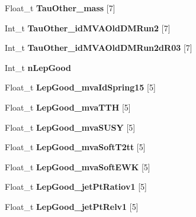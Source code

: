 \begin{DoxyCompactItemize}
Float\+\_\+t {\bfseries Tau\+Other\+\_\+mass} \mbox{[}7\mbox{]}
\item 
\hypertarget{classMiniTree_ae2bc89d76cd0c3ee34619f2c61dff15e}{}\label{classMiniTree_ae2bc89d76cd0c3ee34619f2c61dff15e} 
Int\+\_\+t {\bfseries Tau\+Other\+\_\+id\+M\+V\+A\+Old\+D\+M\+Run2} \mbox{[}7\mbox{]}
\item 
\hypertarget{classMiniTree_aa94b788aafb909c9d7b70bd58156a2b2}{}\label{classMiniTree_aa94b788aafb909c9d7b70bd58156a2b2} 
Int\+\_\+t {\bfseries Tau\+Other\+\_\+id\+M\+V\+A\+Old\+D\+M\+Run2d\+R03} \mbox{[}7\mbox{]}
\item 
\hypertarget{classMiniTree_a4e9d2da62d74ac3353541cc0b2b96aae}{}\label{classMiniTree_a4e9d2da62d74ac3353541cc0b2b96aae} 
Int\+\_\+t {\bfseries n\+Lep\+Good}
\item 
\hypertarget{classMiniTree_a75d844a0b9345e33f4cb04b224fd20ad}{}\label{classMiniTree_a75d844a0b9345e33f4cb04b224fd20ad} 
Float\+\_\+t {\bfseries Lep\+Good\+\_\+mva\+Id\+Spring15} \mbox{[}5\mbox{]}
\item 
\hypertarget{classMiniTree_adc35473a3627a556bcbf9912245e6d18}{}\label{classMiniTree_adc35473a3627a556bcbf9912245e6d18} 
Float\+\_\+t {\bfseries Lep\+Good\+\_\+mva\+T\+TH} \mbox{[}5\mbox{]}
\item 
\hypertarget{classMiniTree_a7483d9a0dfe5cd6cac708ff7b12158d7}{}\label{classMiniTree_a7483d9a0dfe5cd6cac708ff7b12158d7} 
Float\+\_\+t {\bfseries Lep\+Good\+\_\+mva\+S\+U\+SY} \mbox{[}5\mbox{]}
\item 
\hypertarget{classMiniTree_ad3497f8704a3eba4e54cba0241e4706f}{}\label{classMiniTree_ad3497f8704a3eba4e54cba0241e4706f} 
Float\+\_\+t {\bfseries Lep\+Good\+\_\+mva\+Soft\+T2tt} \mbox{[}5\mbox{]}
\item 
\hypertarget{classMiniTree_a930b2adfd6cf106556c6387c20b754a2}{}\label{classMiniTree_a930b2adfd6cf106556c6387c20b754a2} 
Float\+\_\+t {\bfseries Lep\+Good\+\_\+mva\+Soft\+E\+WK} \mbox{[}5\mbox{]}
\item 
\hypertarget{classMiniTree_a5022da5e2296e21d006d8788c64c5d4f}{}\label{classMiniTree_a5022da5e2296e21d006d8788c64c5d4f} 
Float\+\_\+t {\bfseries Lep\+Good\+\_\+jet\+Pt\+Ratiov1} \mbox{[}5\mbox{]}
\item 
\hypertarget{classMiniTree_a3e4a7fa539e34edd93af9a593f596517}{}\label{classMiniTree_a3e4a7fa539e34edd93af9a593f596517} 
Float\+\_\+t {\bfseries Lep\+Good\+\_\+jet\+Pt\+Relv1} \mbox{[}5\mbox{]}
\item 
\hypertarget{classMiniTree_a4ebd142e167f08799ca0e61a374ea73e}{}\label{classMiniTree_a4ebd142e167f08799ca0e61a374ea73e} 

\end{DoxyCompactItemize}
